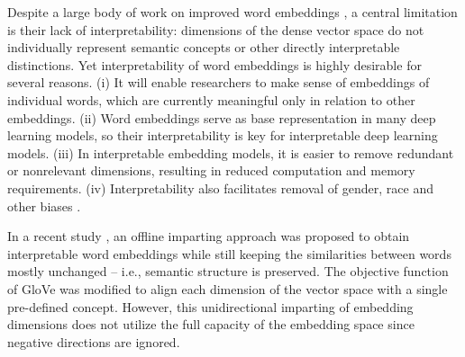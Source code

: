 \documentclass[11pt,a4paper]{article}
\begin{document}
Despite a large body of work on improved word embeddings
\citep{yu2017refining, celikyilmaz15enriching,
  yu14improving, liu15learning, mrksic16counterFitting,
  bollegala16joint, yang16fineTuning}, a central limitation
is their lack of interpretability: dimensions of the dense vector
space do not individually represent semantic concepts
\citep{chen16InfoGAN,levy14dependency} or other directly
interpretable distinctions.
Yet interpretability of word embeddings is highly desirable
for several reasons. 
(i) It will enable researchers to make sense of embeddings
of individual words,  which are currently meaningful only in relation to other embeddings.
(ii) Word embeddings serve as base representation in many deep learning models, so their interpretability is key for interpretable deep learning models.
(iii) In interpretable embedding models, it is easier to remove redundant or nonrelevant dimensions, resulting in reduced computation and memory requirements.
(iv) Interpretability also facilitates removal of gender, race and other biases \citep{dufter19ultraDense}.

In a recent study  \citep{senel20impart}, an offline  imparting approach was proposed to obtain
interpretable word embeddings while still keeping
the similarities between words mostly unchanged -- i.e., semantic structure is preserved. The
objective function of GloVe 
\citep{pennington14glove} was modified to align each
dimension of the vector space with a single
pre-defined concept. However, this unidirectional imparting
of embedding dimensions does not utilize the full capacity
of the embedding space since negative directions are
ignored.


\end{document}
